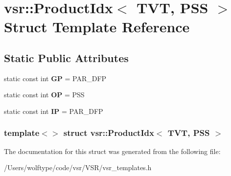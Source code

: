 \hypertarget{structvsr_1_1_product_idx_3_01_t_v_t_00_01_p_s_s_01_4}{\section{vsr\-:\-:Product\-Idx$<$ T\-V\-T, P\-S\-S $>$ Struct Template Reference}
\label{structvsr_1_1_product_idx_3_01_t_v_t_00_01_p_s_s_01_4}
}
\subsection*{Static Public Attributes}
\begin{DoxyCompactItemize}
\item 
\hypertarget{structvsr_1_1_product_idx_3_01_t_v_t_00_01_p_s_s_01_4_afc1e9a9ea4efe8bbd023c3e1d0f646bd}{static const int {\bfseries G\-P} = P\-A\-R\-\_\-\-D\-F\-P}\label{structvsr_1_1_product_idx_3_01_t_v_t_00_01_p_s_s_01_4_afc1e9a9ea4efe8bbd023c3e1d0f646bd}

\item 
\hypertarget{structvsr_1_1_product_idx_3_01_t_v_t_00_01_p_s_s_01_4_a8beb79a7d1a006aa3bacd47b9fc15540}{static const int {\bfseries O\-P} = P\-S\-S}\label{structvsr_1_1_product_idx_3_01_t_v_t_00_01_p_s_s_01_4_a8beb79a7d1a006aa3bacd47b9fc15540}

\item 
\hypertarget{structvsr_1_1_product_idx_3_01_t_v_t_00_01_p_s_s_01_4_a5618ad71b91689630e679ea2d942edfb}{static const int {\bfseries I\-P} = P\-A\-R\-\_\-\-D\-F\-P}\label{structvsr_1_1_product_idx_3_01_t_v_t_00_01_p_s_s_01_4_a5618ad71b91689630e679ea2d942edfb}

\end{DoxyCompactItemize}
\subsubsection*{template$<$$>$ struct vsr\-::\-Product\-Idx$<$ T\-V\-T, P\-S\-S $>$}



The documentation for this struct was generated from the following file\-:\begin{DoxyCompactItemize}
\item 
/\-Users/wolftype/code/vsr/\-V\-S\-R/vsr\-\_\-templates.\-h\end{DoxyCompactItemize}
